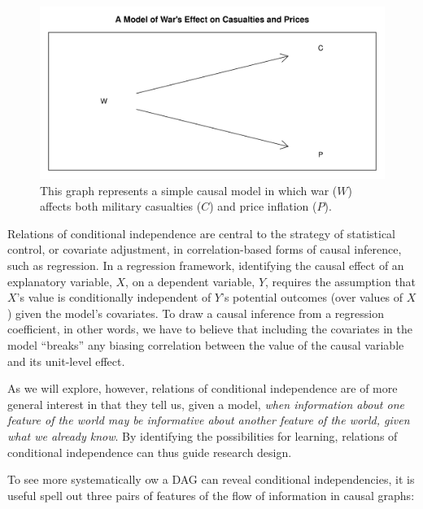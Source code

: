 \documentclass[12pt,]{book}
\begin{document}
\begin{figure}

{\centering \includegraphics[width=.5\textwidth]{ii_files/figure-latex/warDAG-1} 

}

\caption{This graph represents a simple causal model in which war ($W$) affects both military casualties ($C$) and price inflation ($P$).}\label{fig:warDAG}
\end{figure}

Relations of conditional independence are central to the strategy of statistical control, or covariate adjustment, in correlation-based forms of causal inference, such as regression. In a regression framework, identifying the causal effect of an explanatory variable, \(X\), on a dependent variable, \(Y\), requires the assumption that \(X\)'s value is conditionally independent of \(Y\)'s potential outcomes (over values of \(X\)) given the model's covariates. To draw a causal inference from a regression coefficient, in other words, we have to believe that including the covariates in the model ``breaks'' any biasing correlation between the value of the causal variable and its unit-level effect.

As we will explore, however, relations of conditional independence are of more general interest in that they tell us, given a model, \emph{when information about one feature of the world may be informative about another feature of the world, given what we already know}. By identifying the possibilities for learning, relations of conditional independence can thus guide research design.

To see more systematically ow a DAG can reveal conditional independencies, it is useful spell out three pairs of features of the flow of information in causal graphs:
\end{document}
